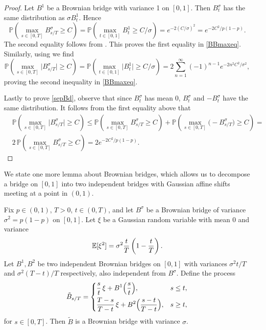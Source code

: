 \begin{proof}
	Let $B^1$ be a Brownian bridge with variance 1 on $[0,1]$. Then $B^\sigma_t$ has the same distribution as $\sigma B^1_t$. Hence
	\begin{equation*}
	\mathbb{P}\left( \max_{s\in[0,T]} B^\sigma_{s/T} \geq C \right) = \mathbb{P}\left( \max_{t\in[0,1]} B^1_t \geq C/\sigma \right) = e^{-2(C/\sigma)^2} = e^{-2C^2/p(1-p)}.
	\end{equation*}
	The second equality follows from \cite[Proposition 12.3.3]{Dudley}. This proves the first equality in \eqref{BBmaxeq}. Similarly, using \cite[Proposition 12.3.4]{Dudley} we find
	\begin{equation*}
	\mathbb{P}\left( \max_{s\in[0,T]} \big| B^\sigma_{s/T}\big| \geq C \right) = \mathbb{P}\left( \max_{t\in[0,1]} \big| B^1_t\big| \geq C/\sigma \right) = 2\sum_{n=1}^\infty (-1)^{n-1}e^{-2n^2C^2/\sigma^2},
	\end{equation*}
	proving the second inequality in \eqref{BBmaxeq}.
	
	Lastly to prove \eqref{sepBd}, observe that since $B^\sigma_t$ has mean 0, $B^\sigma_t$ and $-B^\sigma_t$ have the same distribution. It follows from the first equality above that
	\begin{equation*}
	\begin{split}
	&\mathbb{P}\left( \max_{s\in[0,T]} \big| B^\sigma_{s/T}\big| \geq C \right) \leq \mathbb{P}\left( \max_{s\in[0,T]}  B^\sigma_{s/T} \geq C \right) + \mathbb{P}\left( \max_{s\in[0,T]}  \big(-B^\sigma_{s/T}\big) \geq C \right) = \\
	&2\,\mathbb{P}\left( \max_{s\in[0,T]}  B^\sigma_{s/T} \geq C \right) = 2e^{-2C^2/p(1-p)}.
	\end{split}
	\end{equation*}
\end{proof}

We state one more lemma about Brownian bridges, which allows us to decompose a bridge on $[0,1]$ into two independent bridges with Gaussian affine shifts meeting at a point in $(0,1)$.

\begin{lemma}\label{2bridges}
	Fix $p\in (0,1)$, $T>0$, $t\in(0,T)$, and let $B^\sigma$ be a Brownian bridge of variance $\sigma^2 = p(1-p)$ on $[0,1]$. Let $\xi$ be a Gaussian random variable with mean 0 and variance
	\[
	\mathbb{E}[\xi^2] = \sigma^2\frac{t}{T}\left(1-\frac{t}{T}\right).
	\]
	Let $B^1,B^2$ be two independent Brownian bridges on $[0,1]$ with variances $\sigma^2 t/T$ and $\sigma^2(T-t)/T$ respectively, also independent from $B^\sigma$. Define the process
	\[
	\tilde{B}_{s/T} = \begin{dcases}
	\frac{s}{t}\,\xi + B^1\Big(\frac{s}{t}\Big), & s\leq t,\\
	\frac{T-s}{T-t}\,\xi + B^2\Big(\frac{s-t}{T-t}\Big), & s\geq t,
	\end{dcases}
	\]
	for $s\in [0,T]$. Then $\tilde{B}$ is a Brownian bridge with variance $\sigma$.
\end{lemma}

